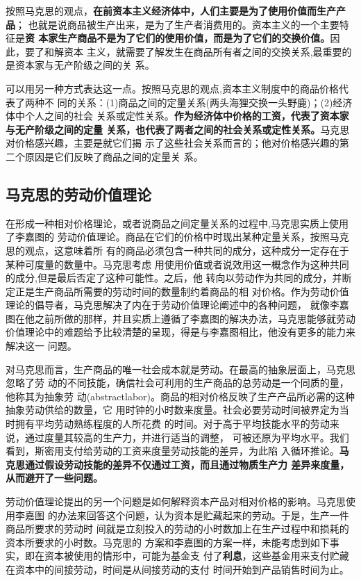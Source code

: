 按照马克思的观点，\textbf{在前资本主义经济体中，人们主要是为了使用价值而生产产品}；
也就是说商品被生产出来，是为了生产者消费用的。资本主义的一个主要特征是\textbf{资
  本家生产商品不是为了它们的使用价值，而是为了它们的交换价值。}因此，要了和解资本
主义，就需要了解发生在商品所有者之间的交换关系,最重要的是资本家与无产阶级之间的关
系。

可以用另一种方式表达这一点。按照马克思的观点,资本主义制度中的商品价格代表了两种不
同的关系：(1)商品之间的定量关系(两头海狸交换一头野鹿)；(2)经济体中个人之间的社会
关系或定性关系。\textbf{作为经济体中价格的工资，代表了资本家与无产阶级之间的定量
  关系，也代表了两者之间的社会关系或定性关系。}马克思对价格感兴趣，主要是就它们揭
示了这些社会关系而言的；他对价格感兴趣的第二个原因是它们反映了商品之间的定量关
系。

\subsection{马克思的劳动价值理论}

在形成一种相对价格理论，或者说商品之间定量关系的过程中,马克思实质上使用了李嘉图的
劳动价值理论。商品在它们的价格中时现出某种定量关系，按照马克思的观点，这意味着所
有的商品必须包含一种共同的成分，这种成分一定存在于某种可度量的数量中。马克思考虑
用使用价值或者说效用这一概念作为这种共同的成分,但是最后否定了这种可能性。之后，他
转向以劳动作为共同的成分，并断定正是生产商品所需要的劳动时间的数量制约着商品的相
对价格。作为劳动价值理论的倡导者，马克思解决了内在于劳动价值理论阐述中的各种问题，
就像李嘉图在他之前所做的那样，并且实质上遵循了李嘉图的解决办法，马克思能够就劳动
价值理论中的难题给予比较清楚的呈现，得是与李嘉图相比，他没有更多的能力来解决这一
问题。

对马克思而言，生产商品的唯一社会成本就是劳动。在最高的抽象层面上，马克思忽略了劳
动的不同技能，确信社会可利用的生产商品的总劳动是一个同质的量，他称其为抽象劳
动(abstractlabor)。商品的相对价格反映了生产产品所必需的这种抽象劳动供给的数量，它
用时钟的小时数来度量。社会必要劳动时间被界定为当时拥有平均劳动熟练程度的人所花费
的时间。对于高于平均技能水平的劳动来说，通过度量其较高的生产力，并进行适当的调整，
可被还原为平均水平。我们看到，斯密用支付给劳动的工资来度量劳动技能的差异，为此陷
入循环推论。\textbf{马克思通过假设劳动技能的差异不仅通过工资，而且通过物质生产力
  差异来度量，从而避开了一些问题。}

劳动价值理论提出的另一个问题是如何解释资本产品对相对价格的影响。马克思使用李嘉图
的办法来回答这个问题，认为资本是贮藏起来的劳动。于是，生产一件商品所要求的劳动时
间就是立刻投入的劳动的小时数加上在生产过程中和损耗的资本所要求的小时数。马克思的
方案和李嘉图的方案一样，未能考虑到如下事实，即在资本被使用的情形中，可能为基金支
付了\textbf{利息}，这些基金用来支付贮藏在资本中的间接劳动，时间是从间接劳动的支付
时间开始到产品销售时间为止。

